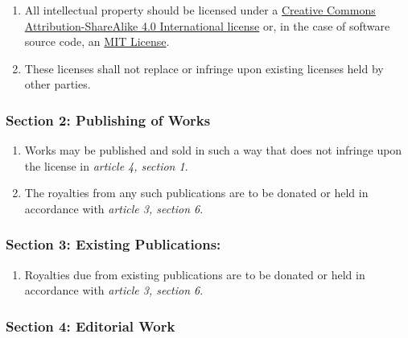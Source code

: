 \documentclass[oneside]{memoir}
\begin{document}
\begin{enumerate}
\def\labelenumi{\arabic{enumi}.}
\tightlist
\item
  All intellectual property should be licensed under a \href{https://creativecommons.org/licenses/by-sa/4.0/}{Creative Commons Attribution-ShareAlike 4.0 International license} or, in the case of software source code, an \href{https://opensource.org/licenses/MIT}{MIT License}.
\item
  These licenses shall not replace or infringe upon existing licenses held by other parties.
\end{enumerate}

\subsubsection*{Section 2: Publishing of Works}\label{section-2-publishing-of-works}

\begin{enumerate}
\def\labelenumi{\arabic{enumi}.}
\tightlist
\item
  Works may be published and sold in such a way that does not infringe upon the license in \emph{article 4, section 1}.
\item
  The royalties from any such publications are to be donated or held in accordance with \emph{article 3, section 6}.
\end{enumerate}

\subsubsection*{Section 3: Existing Publications:}\label{section-3-existing-publications}

\begin{enumerate}
\def\labelenumi{\arabic{enumi}.}
\tightlist
\item
  Royalties due from existing publications are to be donated or held in accordance with \emph{article 3, section 6}.
\end{enumerate}

\subsubsection*{Section 4: Editorial Work}\label{section-4-editorial-work}
\end{document}
